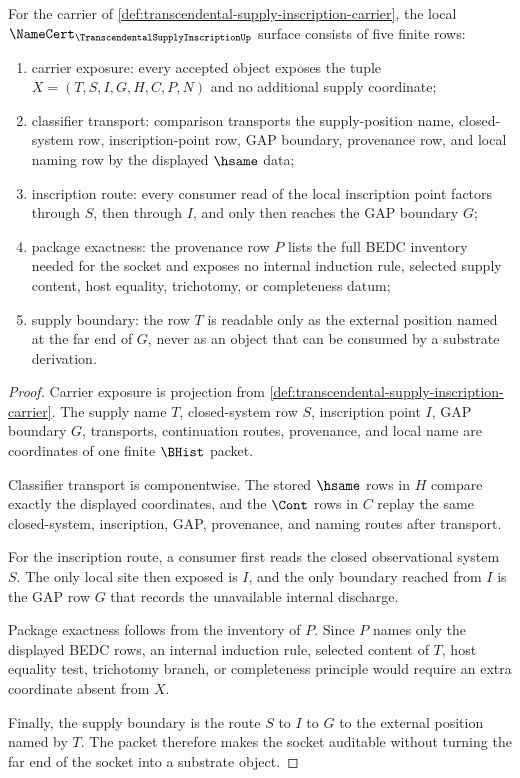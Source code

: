 \begin{theorem}
\label{thm:transcendental-supply-inscription-namecert-obligations}
For the carrier of \autoref{def:transcendental-supply-inscription-carrier}, the local $\NameCert_{\TranscendentalSupplyInscriptionUp}$ surface consists of five finite rows:
\begin{enumerate}
\item carrier exposure: every accepted object exposes the tuple $X=(T,S,I,G,H,C,P,N)$ and no additional supply coordinate;
\item classifier transport: comparison transports the supply-position name, closed-system row, inscription-point row, GAP boundary, provenance row, and local naming row by the displayed $\hsame$ data;
\item inscription route: every consumer read of the local inscription point factors through $S$, then through $I$, and only then reaches the GAP boundary $G$;
\item package exactness: the provenance row $P$ lists the full BEDC inventory needed for the socket and exposes no internal induction rule, selected supply content, host equality, trichotomy, or completeness datum;
\item supply boundary: the row $T$ is readable only as the external position named at the far end of $G$, never as an object that can be consumed by a substrate derivation.
\end{enumerate}
\end{theorem}
\begin{proof}
Carrier exposure is projection from \autoref{def:transcendental-supply-inscription-carrier}. The supply name $T$, closed-system row $S$, inscription point $I$, GAP boundary $G$, transports, continuation routes, provenance, and local name are coordinates of one finite $\BHist$ packet.

Classifier transport is componentwise. The stored $\hsame$ rows in $H$ compare exactly the displayed coordinates, and the $\Cont$ rows in $C$ replay the same closed-system, inscription, GAP, provenance, and naming routes after transport.

For the inscription route, a consumer first reads the closed observational system $S$. The only local site then exposed is $I$, and the only boundary reached from $I$ is the GAP row $G$ that records the unavailable internal discharge.

Package exactness follows from the inventory of $P$. Since $P$ names only the displayed BEDC rows, an internal induction rule, selected content of $T$, host equality test, trichotomy branch, or completeness principle would require an extra coordinate absent from $X$.

Finally, the supply boundary is the route $S$ to $I$ to $G$ to the external position named by $T$. The packet therefore makes the socket auditable without turning the far end of the socket into a substrate object.
\end{proof}

